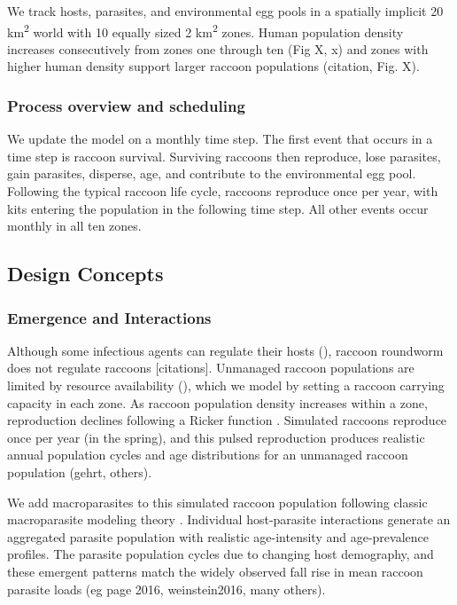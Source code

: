 \documentclass[11pt]{article}
\begin{document}
We track hosts, parasites, and environmental egg pools in a spatially
implicit 20 km\textsuperscript{2} world with 10 equally sized 2
km\textsuperscript{2} zones. Human population density increases
consecutively from zones one through ten (Fig X, x) and zones with
higher human density support larger raccoon populations (citation, Fig. X). 


\subsubsection{Process overview and scheduling}

We update the model on a monthly time step. The first event that occurs in a time step is raccoon survival. Surviving raccoons then reproduce, lose
parasites, gain parasites, disperse, age, and contribute to the
environmental egg pool. Following the typical raccoon life cycle,
raccoons reproduce once per year, with kits entering the population in
the following time step. All other events occur monthly in all ten
zones.

\subsection{Design Concepts}

\subsubsection{Emergence and Interactions}

Although some infectious agents can regulate their hosts (), raccoon
roundworm does not regulate raccoons [citations]. Unmanaged raccoon populations are
limited by resource availability (), which we model by setting a raccoon
carrying capacity in each zone. As raccoon population density
increases within a zone, reproduction declines following a Ricker function \citep{Gurney1998}. Simulated raccoons
reproduce once per year (in the spring), and this pulsed reproduction
produces realistic annual population cycles and age distributions for an
unmanaged raccoon population (gehrt, others).

We add macroparasites to this simulated raccoon population following
classic macroparasite modeling theory \citep{AndersonandMay1978,Anderson1991,Cornell2010}. Individual host-parasite interactions generate an aggregated
parasite population with realistic age-intensity and age-prevalence
profiles. The parasite population cycles due to
changing host demography, and these emergent patterns match the widely
observed fall rise in mean raccoon parasite loads (eg page 2016,
weinstein2016, many others).
\end{document}
